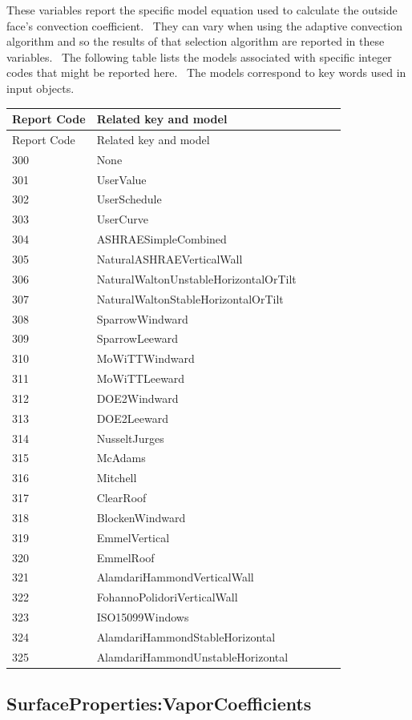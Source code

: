 These variables report the specific model equation used to calculate the outside face's convection coefficient.~ They can vary when using the adaptive convection algorithm and so the results of that selection algorithm are reported in these variables.~ The following table lists the models associated with specific integer codes that might be reported here.~ The models correspond to key words used in input objects.

\begin{longtable}[c]{@{}ll@{}}
\toprule 
Report Code & Related key and model \tabularnewline
\midrule
\endfirsthead

\toprule 
Report Code & Related key and model \tabularnewline
\midrule
\endhead

300 & None~ \tabularnewline
301 & UserValue \tabularnewline
302 & UserSchedule \tabularnewline
303 & UserCurve~~~~~~~~~~~~~~~~~~~~~~~~~~~~~~ \tabularnewline
304 & ASHRAESimpleCombined~~~~~~~~~~~~~~~~~~~ \tabularnewline
305 & NaturalASHRAEVerticalWall~~~~~~~~~~~~~~ \tabularnewline
306 & NaturalWaltonUnstableHorizontalOrTilt~~ \tabularnewline
307 & NaturalWaltonStableHorizontalOrTilt~~~~ \tabularnewline
308 & SparrowWindward~~~~~~~~~~~~~~~~~~~~~~~~ \tabularnewline
309 & SparrowLeeward~~~~~~~~~~~~~~~~~~~~~~~~~ \tabularnewline
310 & MoWiTTWindward~~~~~~~~~~~~~~~~~~~~~~~~~ \tabularnewline
311 & MoWiTTLeeward~~~~~~~~~~~~~~~~~~~~~~~~~~ \tabularnewline
312 & DOE2Windward~~~~~~~~~~~~~~~~~~~~~~~~~~~ \tabularnewline
313 & DOE2Leeward~~~~~~~~~~~~~~~~~~~~~~~~~~~~ \tabularnewline
314 & NusseltJurges~~~~~~~~~~~~~~~~~~~~~~~~~~ \tabularnewline
315 & McAdams~~~~~~~~~~~~~~~~~~~~~~~~~~~~~~~~ \tabularnewline
316 & Mitchell~~~~~~~~~~~~~~~~~~~~~~~~~~~~~~~ \tabularnewline
317 & ClearRoof~~~~~~~~~~~~~~~~~~~~~~~~~~~~~~ \tabularnewline
318 & BlockenWindward~~~~~~~~~~~~~~~~~~~~~~~~ \tabularnewline
319 & EmmelVertical~~~~~~~~~~~~ ~~~~~~~~~~~~~~ \tabularnewline
320 & EmmelRoof~~~~~~~~~~~~~~~~~~~~~~~~~~~~~~ \tabularnewline
321 & AlamdariHammondVerticalWall~~~~~~~~~~~~ \tabularnewline
322 & FohannoPolidoriVerticalWall~~~~~~~~~~~~ \tabularnewline
323 & ISO15099Windows~~~~~~~~~~~~~~~~~~~~~~~~ \tabularnewline
324 & AlamdariHammondStableHorizontal~~~~~~~~ \tabularnewline
325 & AlamdariHammondUnstableHorizontal~~~~~~ \tabularnewline
\bottomrule
\end{longtable}

\subsection{SurfaceProperties:VaporCoefficients}\label{surfacepropertiesvaporcoefficients}

